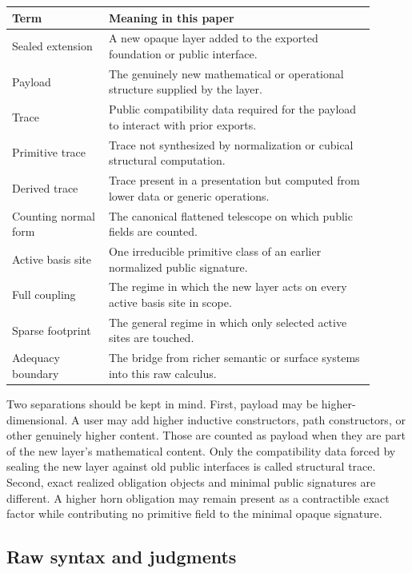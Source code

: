 \documentclass{lmcs}
\begin{document}
\begin{center}
\begin{tabular}{p{0.24\linewidth}p{0.66\linewidth}}
\hline
Term & Meaning in this paper \\
\hline
Sealed extension & A new opaque layer added to the exported foundation or public interface. \\
Payload & The genuinely new mathematical or operational structure supplied by the layer. \\
Trace & Public compatibility data required for the payload to interact with prior exports. \\
Primitive trace & Trace not synthesized by normalization or cubical structural computation. \\
Derived trace & Trace present in a presentation but computed from lower data or generic operations. \\
Counting normal form & The canonical flattened telescope on which public fields are counted. \\
Active basis site & One irreducible primitive class of an earlier normalized public signature. \\
Full coupling & The regime in which the new layer acts on every active basis site in scope. \\
Sparse footprint & The general regime in which only selected active sites are touched. \\
Adequacy boundary & The bridge from richer semantic or surface systems into this raw calculus. \\
\hline
\end{tabular}
\end{center}

Two separations should be kept in mind.  First, payload may be higher-dimensional.  A user
may add higher inductive constructors, path constructors, or other genuinely higher content.
Those are counted as payload when they are part of the new layer's mathematical content.
Only the compatibility data forced by sealing the new layer against old public interfaces is
called structural trace.  Second, exact realized obligation objects and minimal public
signatures are different.  A higher horn obligation may remain present as a contractible exact
factor while contributing no primitive field to the minimal opaque signature.

\subsection{Raw syntax and judgments}
\end{document}
